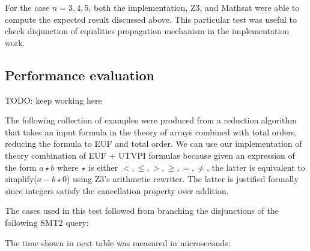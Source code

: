 For the case $n = 3, 4, 5$, both the implementation, Z3, and Mathsat were able
to compute the expected result discussed above. This particular test
was useful to check disjunction of equalities propagation mechanism in the
implementation work.

\subsection{Performance evaluation}


TODO: keep working here

The following collection of examples were produced from a reduction 
algorithm that takes an input formula in the theory of arrays combined with
total orders, reducing the formula to EUF and total order. We can use our
implementation of theory combination of EUF + UTVPI formulas because 
given an expression of the form $a \star b$ where
$\star$ is either $<, \leq, >, \geq, =, \neq$, 
the latter is equivalent to 
simplify($a - b \star 0$) using Z3's arithmetic rewriter. 
The latter is justified formally since integers 
satisfy the cancellation property over addition.

The cases used in this test followed from branching the disjunctions
of the following SMT2 query:



The time shown in next table was measured in microseconds:

